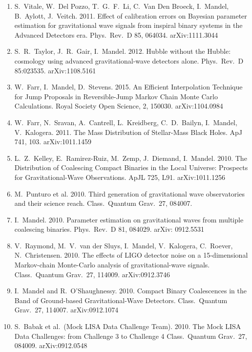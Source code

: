\documentclass[margin,line]{res}
\begin{document}
\begin{resume}
\begin{enumerate}
\item  S.~Vitale, W.~Del Pozzo, T.~G.~F.~Li, C.~Van Den Broeck, I.~Mandel, B.~Aylott, J.~Veitch.  2011.  Effect of calibration errors on Bayesian parameter estimation for gravitational wave signals from inspiral binary systems in the Advanced Detectors era.  Phys.~Rev.~D 85, 064034. arXiv:1111.3044
 
\item  S.~R.~Taylor, J.~R.~Gair, I.~Mandel. 2012. Hubble without the Hubble: cosmology using advanced gravitational-wave detectors alone. Phys.~Rev.~D 85:023535. arXiv:1108.5161 

\item  W.~Farr, I.~Mandel, D.~Stevens. 2015.  An Efficient Interpolation Technique for Jump Proposals in Reversible-Jump Markov Chain Monte Carlo Calculations.  Royal Society Open Science, 2, 150030. arXiv:1104.0984

\item  W.~Farr, N.~Sravan, A.~Cantrell, L.~Kreidberg, C.~D.~Bailyn, I.~Mandel, V.~Kalogera. 2011. The Mass Distribution of Stellar-Mass Black Holes. ApJ 741, 103. arXiv:1011.1459

\item  L.~Z.~Kelley, E.~Ramirez-Ruiz, M.~Zemp, J.~Diemand, I.~Mandel. 2010. The Distribution of Coalescing Compact Binaries in the Local Universe: Prospects for Gravitational-Wave Observations. ApJL 725, L91.  arXiv:1011.1256

\item  M.~Punturo et al. 2010. Third generation of gravitational wave observatories and their science reach.  Class.~Quantum Grav.~27, 084007.

\item  I.~Mandel. 2010.  Parameter estimation on gravitational waves from multiple coalescing binaries.  Phys.~Rev.~D 81, 084029. arXiv: 0912.5531

\item  V.~Raymond, M.~V.~van der Sluys, I.~Mandel, V.~Kalogera, C.~Roever, N.~Christensen. 2010. The effects of LIGO detector noise on a 15-dimensional Markov-chain Monte-Carlo analysis of gravitational-wave signals.  Class.~Quantum Grav.~27, 114009. arXiv:0912.3746

\item  I.~Mandel and R.~O'Shaughnessy.  2010.  Compact Binary Coalescences in the Band of Ground-based Gravitational-Wave Detectors.  Class.~Quantum Grav.~27, 114007. arXiv:0912.1074  

\item  S.~Babak et al.~(Mock LISA Data Challenge Team). 2010.  The Mock LISA Data Challenges: from Challenge 3 to Challenge 4 Class.~Quantum Grav.~27, 084009.  arXiv:0912.0548  


\end{enumerate}
\end{resume}
\end{document}
